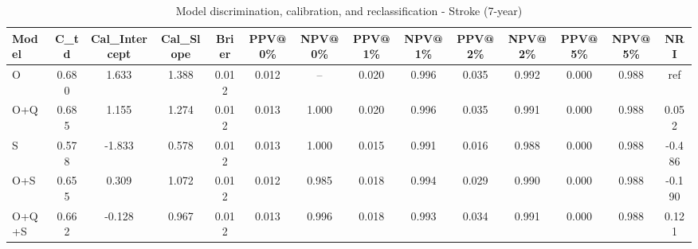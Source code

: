\begin{table}[htbp]
\centering
\small
\caption{Model discrimination, calibration, and reclassification - Stroke (7-year)}
\label{tab:perf_stroke_7y}
\begin{tabular}{lccccccccccccc}
\toprule
Model & C\_td & Cal\_Intercept & Cal\_Slope & Brier & PPV@0\% & NPV@0\% & PPV@1\% & NPV@1\% & PPV@2\% & NPV@2\% & PPV@5\% & NPV@5\% & NRI \\
\midrule
O & 0.680 & 1.633 & 1.388 & 0.012 & 0.012 & -- & 0.020 & 0.996 & 0.035 & 0.992 & 0.000 & 0.988 & ref \\
O+Q & 0.685 & 1.155 & 1.274 & 0.012 & 0.013 & 1.000 & 0.020 & 0.996 & 0.035 & 0.991 & 0.000 & 0.988 & 0.052 \\
S & 0.578 & -1.833 & 0.578 & 0.012 & 0.013 & 1.000 & 0.015 & 0.991 & 0.016 & 0.988 & 0.000 & 0.988 & -0.486 \\
O+S & 0.655 & 0.309 & 1.072 & 0.012 & 0.012 & 0.985 & 0.018 & 0.994 & 0.029 & 0.990 & 0.000 & 0.988 & -0.190 \\
O+Q+S & 0.662 & -0.128 & 0.967 & 0.012 & 0.013 & 0.996 & 0.018 & 0.993 & 0.034 & 0.991 & 0.000 & 0.988 & 0.121 \\
\bottomrule
\end{tabular}
\end{table}